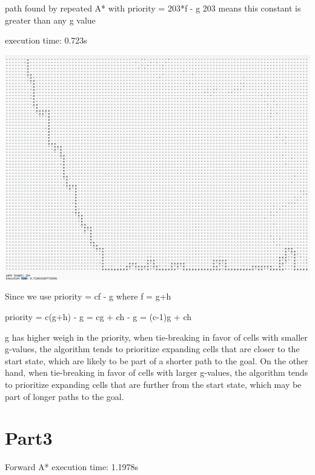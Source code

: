\documentclass[12pt, letterpaper]{article}
\begin{document}
path found by repeated A* with priority = 203*f - g
203 means this constant is greater than any g value

execution time: 0.723s

\includegraphics[width=\textwidth,height=\textheight]{part2b.png}

Since we use priority = cf - g where f = g+h

priority = c(g+h) - g = cg + ch - g = (c-1)g + ch

g has higher weigh in the priority, when tie-breaking in favor of cells with smaller g-values, the algorithm tends to prioritize expanding cells that are closer to the start state, which are likely to be part of a shorter path to the goal. On the other hand, when tie-breaking in favor of cells with larger g-values, the algorithm tends to prioritize expanding cells that are further from the start state, which may be part of longer paths to the goal. 

\section{Part3}

Forward A* execution time: 1.1978s
\end{document}
